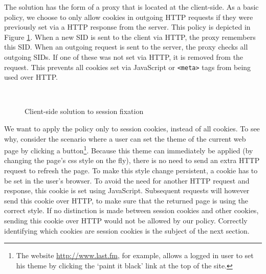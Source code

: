 The solution has the form of a proxy that is located at the client-side. As a basic policy, we choose to only allow cookies in outgoing HTTP requests if they were previously set via a HTTP response from the server. This policy is depicted in Figure \ref{fig:clientside-proxy}. When a new SID is sent to the client via HTTP, the proxy remembers this SID. When an outgoing request is sent to the server, the proxy checks all outgoing SIDs. If one of these was not set via HTTP, it is removed from the request. This prevents all cookies set via JavaScript or \texttt{<meta>} tags from being used over HTTP.

\begin{figure}[ht]
	\centering
	\\
	\caption{Client-side solution to session fixation}
	\label{fig:clientside-proxy}
\end{figure}

We want to apply the policy only to \glspl{session cookie}, instead of all cookies. To see why, consider the scenario where a user can set the theme of the current web page by clicking a button\footnote{The website \url{http://www.last.fm}, for example, allows a logged in user to set his theme by clicking the `paint it black' link at the top of the site.}. Because this theme can immediately be applied (by changing the page's css style on the fly), there is no need to send an extra HTTP request to refresh the page. To make this style change persistent, a cookie has to be set in the user's browser. To avoid the need for another HTTP request and response, this cookie is set using JavaScript. Subsequent requests will however send this cookie over HTTP, to make sure that the returned page is using the correct style. If no distinction is made between session cookies and other cookies, sending this cookie over HTTP would not be allowed by our policy. Correctly identifying which cookies are session cookies is the subject of the next section.

